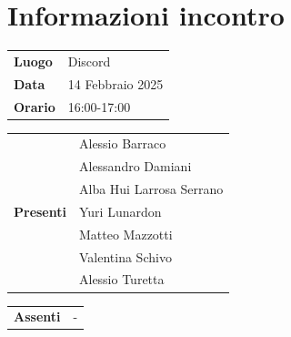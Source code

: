 \section{Informazioni incontro}
\vspace{0.25cm}
\begin{tabular}{p{1.75cm} | l}
    \textbf{Luogo} & Discord\\
    \textbf{Data} & 14 Febbraio 2025\\
    \textbf{Orario} & 16:00-17:00\\
\end{tabular}

\vspace{0.5cm}
\noindent
\begin{tabular}{p{1.75cm} | l}
    \multirow{7}{*}{\textbf{Presenti}}
        & Alessio Barraco\\
        & Alessandro Damiani \\ %
        & Alba Hui Larrosa Serrano\\
        & Yuri Lunardon\\
        & Matteo Mazzotti\\
        & Valentina Schivo\\
        & Alessio Turetta
\end{tabular}

\vspace{0.5cm}
\noindent
\begin{tabular}{p{1.75cm} | l}
    \multirow{1}{*}{\textbf{Assenti}}
        & -\\
\end{tabular}

\vspace{0.5cm}
\noindent
